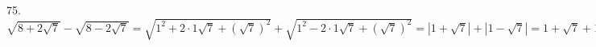 75. $\sqrt{8+2\sqrt{7}}-\sqrt{8-2\sqrt{7}}=\sqrt{1^2+2\cdot1\sqrt{7}+(\sqrt{7})^2}+\sqrt{1^2-2\cdot1\sqrt{7}+(\sqrt{7})^2}=|1+\sqrt{7}|+|1-\sqrt{7}|=
1+\sqrt{7}+1-\sqrt{7}=2.$\\
